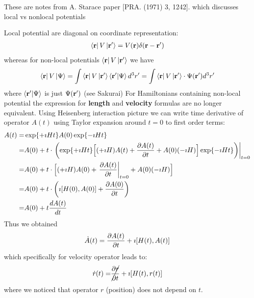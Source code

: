 \documentclass[11pt]{article}
\begin{document}
These are notes from  A. Starace paper [PRA. (1971) 3, 1242].
which discusses local vs nonlocal potentials 


Local potential are diagonal on coordinate representation:
\begin{align*}
   \bra{\vb r}V\ket{ \vb r'} =V(\vb r) \delta(\vb r- \vb r')
\end{align*}
whereas for non-local potentials $\bra{\vb r}V\ket{ \vb r'}$  we have 
\begin{align*}
   \bra{\vb r}V\ket{ \Psi} = \int  \bra{\vb r} V\ket{ \vb r'}   \bra{\vb r'}\ket{ \Psi} d^3r' = \int      \bra{\vb r} V\ket{ \vb r'} \cdot \Psi(\vb r') d^3r' 
\end{align*}
where  $ \bra{\vb r'}\ket{ \Psi}$ is just $ \Psi(\vb r')$ (see Sakurai)
For Hamiltonians containing non-local potential  the expression for {\bf length}  and {\bf velocity}  formulas are no  longer equivalent.
Using Heisenberg interaction picture we can write  time derivative of operator $A(t)$  using Taylor expansion around $t=0$  to first order terms:
\begin{align*}
    A(t) = & \exp{+\imath H t}A(0)  \exp{-\imath H t}   \\
          =& A(0) + t \cdot  \left. 
           \left(\exp{+\imath H t} \Big[ (+\imath H ) A(t) +\pdv{A(t)}{t} + A(0)(-\imath H
           ) \Big]\exp{-\imath H t} \right)\right|_{t=0} \\
    =& A(0) +t \cdot    \Big[ (+\imath H ) A(0)  +\left.\pdv{A(t)}{t}\right|_{t=0} + A(0)(-\imath H ) \Big] \\ 
    =&     A(0) +t \cdot \left(  \imath [H(0), A(0)]  +\pdv{A(0)}{t} \right) \\
    =&   A(0)  +  t \frac{dA(t)}{dt} 
\end{align*}
Thus   we obtained
\begin{align*}
 \dot A(t) = \pdv{A(t)}{t} + \imath [H(t),A(t)]
\end{align*}
which specifically for velocity operator  leads to:
\begin{align*}
 \dot r(t)  =& \cancel{\pdv{ r}{t }} + \imath [H(t),r(t)] \\
\end{align*}
where we noticed that operator $r$  (position) does not depend on $t$.
\end{document}
